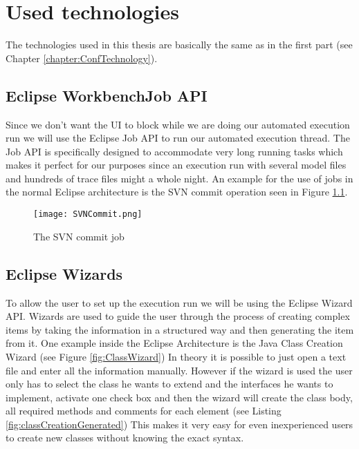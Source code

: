 \chapter{Used technologies}
\label{chapter:AutoTechnologies}

The technologies used in this thesis are basically the same as in
the first part (see Chapter \ref{chapter:ConfTechnology}).

\section{Eclipse WorkbenchJob API}
\label{section:AutoTechJob}
Since we don't want the UI to block while we are doing our automated
execution run we will use the Eclipse Job API to run our
automated execution thread.
The Job API is specifically designed to accommodate very long running
tasks which makes it perfect for our purposes since an execution
run with several model files and hundreds of trace files might
a whole night.
An example for the use of jobs in the normal Eclipse architecture
is the SVN commit operation seen in Figure \ref{fig:SVNCommit}.

\begin{figure}[SVNCommit]
  \centering
  \texttt{[image: SVNCommit.png]}
  \caption[The SVN commit job]%
  {The SVN commit job\protect\footnotemark}
  \label{fig:SVNCommit}
\end{figure}



\section{Eclipse Wizards}
\label{section:AutoTechWizards}
To allow the user to set up the execution run we will be using the
Eclipse Wizard API.
Wizards are used to guide the user through the process of creating complex items by taking
the information in a structured way and then generating the item from it.
One example inside the Eclipse Architecture is the Java Class Creation Wizard (see Figure \ref{fig:ClassWizard})
In theory it is possible to just open a text file and enter all the information manually.
However if the wizard is used the user only has to select the class he wants to extend
and the interfaces he wants to implement, activate one check box and then the wizard will
create the class body, all required methods and comments for each element (see Listing \ref{fig:classCreationGenerated})
This makes it very easy for even inexperienced users to create new classes without knowing
the exact syntax.

